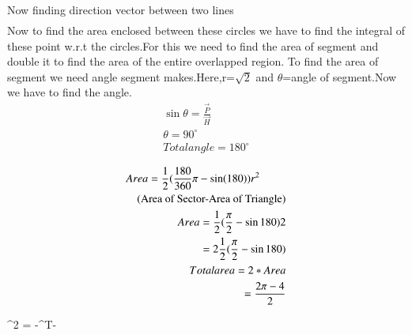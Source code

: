 \documentclass[journal,12pt,twocolumn]{IEEEtran}
\begin{document}
 Now finding direction vector between two lines\\
 \begin{align}
 \end{align}
 Now to find the area enclosed between these circles we have to find the integral of these point w.r.t the circles.For this we need to find the area of segment and double it to find the area of the entire overlapped region. To find the area of segment we need angle segment makes.Here,r=$\sqrt{2}$ and $\theta$=angle of segment.Now we have to find the angle.\\ 
\begin{align*}
\sin \theta=\frac{\vec{P}}{\vec{H}}\\ 
\theta=90^{\circ}\\
Total angle=180^{\circ}\\
\end{align*}
 \begin{align}
 \begin{multlined}
 Area=\frac{1}{2}(\frac{180}{360}\pi-\sin (180))r^{2}\\
 $(Area of Sector-Area of Triangle)$
\end{multlined}\\
Area={\frac{1}{2}}(\frac{\pi}{2}-\sin 180)2\\
=2{\frac{1}{2}}(\frac{\pi}{2}-\sin 180)\\
Total area=2*Area\\
=\frac{2\pi-4}{2}
\end{align}

^2 = {-}^T{-}
  
\end{document}
